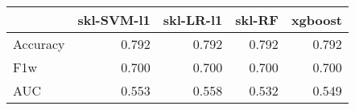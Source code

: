 \begin{tabular}{lrrrr}
\toprule
{} &  skl-SVM-l1 &  skl-LR-l1 &  skl-RF &  xgboost \\
\midrule
Accuracy &       0.792 &      0.792 &   0.792 &    0.792 \\
F1w      &       0.700 &      0.700 &   0.700 &    0.700 \\
AUC      &       0.553 &      0.558 &   0.532 &    0.549 \\
\bottomrule
\end{tabular}

